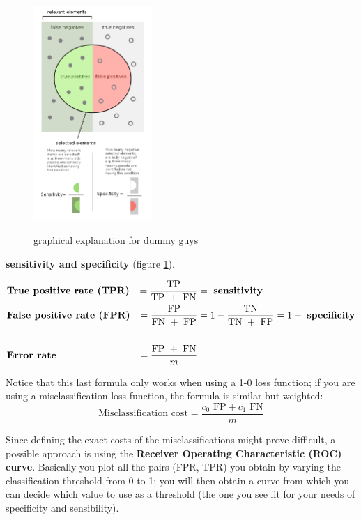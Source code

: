     \begin{figure}[H]
      \caption{graphical explanation for dummy guys} %
      \centering
      \includegraphics[width=0.40\textwidth]{SensitivityandSpecificity}
      \label{sensitivSpecificity}
      \end{figure}

    \textbf{sensitivity and specificity} (figure \ref{sensitivSpecificity}).
     
    \begin{align*}
      &\text{\textbf{True positive rate (TPR)}} &= \frac{\text{TP}}{\text{TP } + \text{ FN}} 
      &= \text{ \textbf{sensitivity}}\\
      &\text{\textbf{False positive rate (FPR)}} 
      &= \frac{\text{FP}}{\text{FN } + \text{ FP}} 
      &= 1 - \frac{\text{TN}}{\text{TN } + \text{ FP}} = 1 - \text{ \textbf{specificity}} \\\\
      &\text{\textbf{Error rate}} &= \frac{\text{FP } + \text{ FN}}{m}
    \end{align*}

    
    Notice that this last formula only works when using a 1-0 loss function; if
    you are using a misclassification loss function, the formula is similar but
    weighted:
    $$\text{Misclassification cost}= \frac{c_0 \text{ FP} + c_1 \text{ FN}}{m}$$

    Since defining the exact costs of the misclassifications might prove
    difficult, a possible approach is using the \textbf{Receiver Operating
    Characteristic (ROC) curve}. Basically you plot all the pairs (FPR, TPR) you
    obtain by varying the classification threshold from 0 to 1; you will then
    obtain a curve from which you can decide which value to use as a threshold
    (the one you see fit for your needs of specificity and sensibility). 
   
